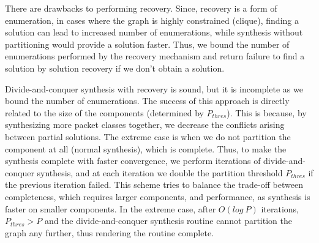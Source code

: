 There are drawbacks to performing recovery. Since, recovery is a 
form of enumeration, in cases where the graph is highly constrained
(clique), finding a solution can lead to increased number of enumerations,
while synthesis without partitioning would provide a solution faster. 
Thus, we bound the number of enumerations performed by the 
recovery mechanism and return failure to find a solution by solution recovery
if we don't obtain a solution. 

Divide-and-conquer synthesis with recovery is sound, but 
it is incomplete as we bound the
number of enumerations. The success of this approach
is directly related to the size of the components (determined by $P_{thres}$). 
This is because, by synthesizing more packet classes together, we decrease the
conflicts arising between partial solutions. The extreme case is when we do not 
partition the component at all (normal synthesis), which is complete. 
Thus, to make the synthesis complete with faster convergence, we
perform iterations of divide-and-conquer synthesis, and at each iteration we double the
partition threshold $P_{thres}$ if the previous iteration failed. 
This scheme tries to balance the trade-off between completeness, which
requires larger components, and performance, as synthesis is faster on smaller
components. 
In the extreme case, after $O(log~P)$
iterations, $P_{thres} > P$ and the divide-and-conquer synthesis routine cannot partition the graph any further,
thus rendering the routine complete. 
 
